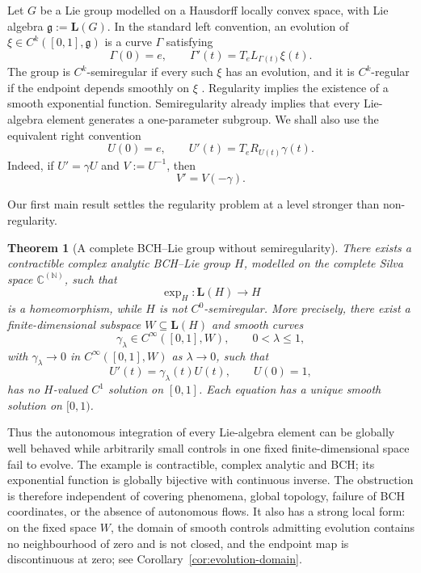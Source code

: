 \documentclass[11pt]{article}
\newtheorem{theorem}{Theorem}[section]
\theoremstyle{remark}
\begin{document}
Let $G$ be a Lie group modelled on a Hausdorff locally convex space, with Lie
algebra $\mathfrak g:=\mathbf L(G)$.  In the standard left convention, an
evolution of $\xi\in C^k([0,1],\mathfrak g)$ is a curve $\Gamma$ satisfying
\[
  \Gamma(0)=e,
  \qquad
  \Gamma'(t)=T_eL_{\Gamma(t)}\xi(t).
\]
The group is $C^k$-semiregular if every such $\xi$ has an evolution, and it is
$C^k$-regular if the endpoint depends smoothly on $\xi$
\cite{Milnor1984,GlocknerSemiregularity,GlocknerNeebBook2026}.  Regularity
implies the existence of a smooth exponential function.  Semiregularity
already implies that every Lie-algebra element generates a one-parameter
subgroup.  We shall also use the equivalent right convention
\begin{equation}
  U(0)=e,
  \qquad
  U'(t)=T_eR_{U(t)}\gamma(t).
  \label{eq:right-evolution}
\end{equation}
Indeed, if $U'=\gamma U$ and $V:=U^{-1}$, then
\[
  V'=V(-\gamma).
\]

Our first main result settles the regularity problem at a level stronger than
non-regularity.

\begin{theorem}[A complete BCH--Lie group without semiregularity]
\label{thm:existence}
There exists a contractible complex analytic BCH--Lie group $H$, modelled on
the complete Silva space $\mathbb C^{(\mathbb N)}$, such that
\[
  \exp_H:\mathbf L(H)\longrightarrow H
\]
is a homeomorphism, while $H$ is not $C^0$-semiregular.  More precisely,
there exist a finite-dimensional subspace $W\subseteq\mathbf L(H)$ and smooth
curves
\[
  \gamma_\lambda\in C^\infty([0,1],W),
  \qquad 0<\lambda\leq1,
\]
with $\gamma_\lambda\to0$ in $C^\infty([0,1],W)$ as $\lambda\to0$, such that
\[
  U'(t)=\gamma_\lambda(t)U(t),
  \qquad U(0)=1,
\]
has no $H$-valued $C^1$ solution on $[0,1]$.  Each equation has a unique
smooth solution on $[0,1)$.
\end{theorem}

Thus the autonomous integration of every Lie-algebra element can be globally
well behaved while arbitrarily small controls in one fixed finite-dimensional
space fail to evolve.  The example is contractible, complex analytic and
BCH; its exponential function is globally bijective with continuous inverse.
The obstruction is therefore independent of covering phenomena, global
topology, failure of BCH coordinates, or the absence of autonomous flows.  It
also has a strong local form: on the fixed space $W$, the domain of smooth
controls admitting evolution contains no neighbourhood of zero and is not
closed, and the endpoint map is discontinuous at zero; see
Corollary~\ref{cor:evolution-domain}.
\end{document}
